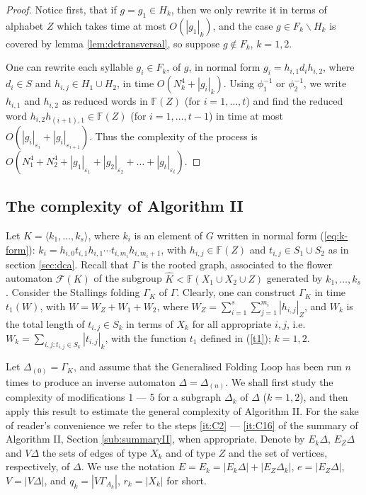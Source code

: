 \documentclass[a4paper,12pt]{article}
\newcommand{\G}{\Gamma }
\newcommand{\D}{\Delta }
\newcommand{\e}{\varepsilon }
\newcommand{\T}{\Theta }
\newcommand{\cF}{{\cal{F}}}
\numberwithin{equation}{section}
\numberwithin{figure}{section}
\newcommand{\FF}{\ensuremath{\mathbb{F}}}
\renewcommand{\cF}{\mathcal{F}}
\newcommand{\la}{\langle}
\newcommand{\ra}{\rangle}
\begin{document}
\begin{proof} Notice first, that if $g = g_1 \in H_k$, then we
only rewrite it in terms of alphabet $Z$ which takes time at most
$O(|g_1|_k)$, and the case $g \in F_k \smallsetminus H_k$ is
covered by lemma \ref{lem:dctransversal}, so suppose $g \notin
F_k$, $k=1,2$.

One can rewrite each syllable $g_i \in F_k$, of $g$, in normal form
$g_i=h_{i,1}d_ih_{i,2}$, where $d_i\in S$ and $h_{i,j}\in H_1\cup
H_2$, in time  $O(N^4_k + |g_i|_k)$. Using $\phi_1^{-1}$ or
$\phi_2^{-1}$, we write $h_{i,1}$ and $h_{i,2}$ as reduced words
in $\FF(Z)$ (for $i=1, \ldots, t$) and find the reduced word
$h_{i,2}h_{(i+1),1}\in \FF(Z)$ (for $i=1, \ldots, t-1$) in time at
most $O(|g_i|_{\e_i}+|g_i|_{\e_{i+1}})$.  Thus the
complexity of the process is $O(N^4_1+ N^4_2 +
|g_1|_{\e_1}+|g_2|_{\e_2}+ \ldots +|g_t|_{\e_t})$. \end{proof}


\subsection{The complexity of Algorithm II}\label{sub:resolution}

Let $K=\la k_1, \ldots , k_s\ra$, where $k_i$ is an element of $G$
written in normal form (\ref{eq:k-form}): $k_i=
h_{i,0}t_{i,1}h_{i,1}\cdots t_{i,m_i}h_{i,m_i+1}$, with
$h_{i,j}\in \FF(Z)$ and $t_{i,j}\in S_1\cup S_2$ as in section
\ref{sec:dca}. Recall that $\G$ is the rooted graph, associated to
the flower automaton $\cF(K)$ of the subgroup $\hat K < \FF(X_1\cup
X_2 \cup Z)$ generated by $k_1, \ldots , k_s$.
Consider the Stallings folding $\G_K$ of $\G$. Clearly, one can
construct $\G_K$ in time  $t_1(W)$, with $W = W_Z+W_1+W_2$,
 where $W_Z =
\mathop{\sum}\limits_{i=1}^{s}
\mathop{\sum}\limits_{j=1}^{m_i}|h_{i,j}|_Z$, and $W_k$ is the
total length of $t_{i,j} \in S_k$ in terms of $X_k$ for all
appropriate $i,j$, i.e. $W_k = \mathop{\sum}\limits_{i,j:
t_{i,j}\in S_k} |t_{i,j}|_k$, with the function $t_1$ defined in
(\ref{t1}); $k=1,2$.

Let $\D_{(0)} = \G_K$,
 and assume that the Generalised Folding Loop has been run $n$ times to produce an
inverse automaton $\D=\D_{(n)}$.
We shall
first study  the complexity of modifications 1 --- 5 for a subgraph $\D_k$ of $\D$ ($k=1,2$), and then apply this result
to estimate the general complexity of Algorithm II. For the sake of reader's convenience we refer to the steps \ref{it:C2} --- \ref{it:C16} of the summary of Algorithm II, Section \ref{sub:summaryII}, when appropriate. Denote by $E_k
\D$, $E_Z \D$ and $V\D$ the sets of edges of type $X_k$ and of
type $Z$ and the set of vertices, respectively, of  $\D$.
 We use the notation $E=E_k = |E_k \D| + |E_Z \D_k|$, $e = |E_Z \D|$, $V = |V \D|$, and $q_k = |V
\G_{A_k}|$, $r_k = |X_k|$ for short.
\end{document}
